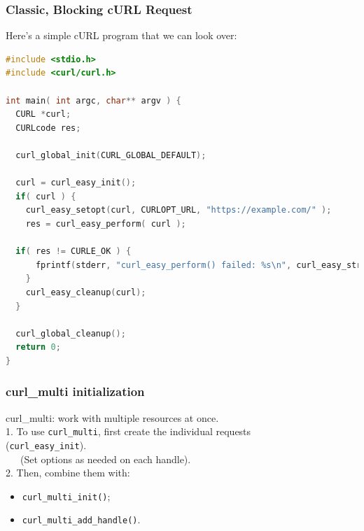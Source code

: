 \begin{frame}[fragile]
\frametitle{Classic, Blocking cURL Request}

Here's a simple cURL program that we can look over:

\begin{lstlisting}[language=C]
#include <stdio.h>
#include <curl/curl.h>
 
int main( int argc, char** argv ) {
  CURL *curl;
  CURLcode res;
 
  curl_global_init(CURL_GLOBAL_DEFAULT);
 
  curl = curl_easy_init();
  if( curl ) {
    curl_easy_setopt(curl, CURLOPT_URL, "https://example.com/" );
    res = curl_easy_perform( curl );
    
  if( res != CURLE_OK ) {
      fprintf(stderr, "curl_easy_perform() failed: %s\n", curl_easy_strerror(res));
    }
    curl_easy_cleanup(curl);
  }
 
  curl_global_cleanup();
  return 0;
}
\end{lstlisting}


\end{frame}



\begin{frame}
  \frametitle{curl\_multi initialization}

  
    curl\_multi: work with multiple resources at once.\\[1em]
    
    1. To use {\tt curl\_multi}, first create the individual requests \\ \hspace{2em} ({\tt curl\_easy\_init}).\\
    ~~~(Set options as needed on each handle).\\[1em]

    2. Then, combine them with:
    \begin{itemize}
      \item {\tt curl\_multi\_init()};
      \item {\tt curl\_multi\_add\_handle()}.
    \end{itemize}

  

\end{frame}


